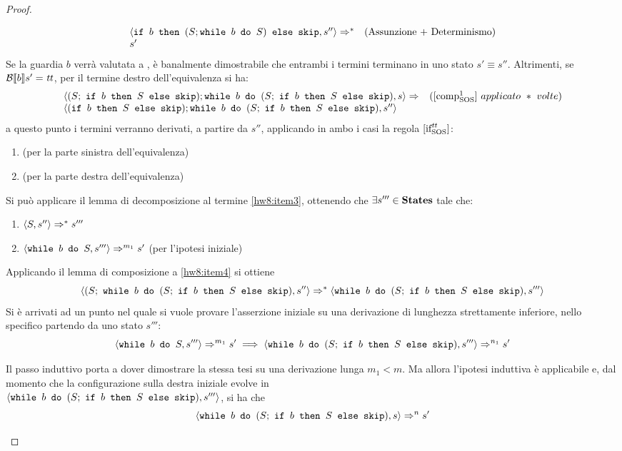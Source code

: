 \begin{proof}
\begin{itemize}
$$\begin{array}{lr}
  \confSs{\ifABC{b}{(S;\wbS{b}{S})}{\skipForFriends}}{s''} \Rar{*} & (\text{Assunzione + Determinismo})\\
  s'
  \end{array}
  $$
  Se la guardia $b$ verrà valutata a \semfalse, è banalmente dimostrabile che
  entrambi i termini terminano in uno stato $s' \equiv{} s''$.
  Altrimenti, se $\B{b}' = \semtrue$, per il termine destro dell'equivalenza 
  si ha:
  $$
  \begin{array}{lr}
  \confSs{ (S;\ \ifABC{b}{S}{\skipForFriends});
            \wbS{b}{(S;\ \ifABC{b}{S}{\skipForFriends})}
         }{s} \Rar{}& (\compoSOS\ applicato\ *\ volte) \\
  \confSs{ (\ifABC{b}{S}{\skipForFriends});
            \wbS{b}{(S;\ \ifABC{b}{S}{\skipForFriends})}
         }{s''}
  \end{array}
  $$
  a questo punto i termini verranno derivati, a partire da $s''$, applicando
  in ambo i casi la regola $\ifttSOS$:
  \begin{enumerate}
    \item {} (per la parte sinistra dell'equivalenza)
    \label{hw8:item3}
    \item {}
      (per la parte destra dell'equivalenza)
  \end{enumerate}
  Si può applicare il lemma di decomposizione al termine \ref{hw8:item3},
  ottenendo che $\exists{s'''} \in \states$ tale che:
  \begin{enumerate}[label=(\alph*)]
    \item $\confSs{S}{s''} \Rar{*} s'''$
    \label{hw8:item4}
    \item $\confSs{\wbS{b}{S}}{s'''} \Rar{m_1} s'$ (per l'ipotesi iniziale)
    \label{hw8:item5}
  \end{enumerate}
  Applicando il lemma di composizione a \ref{hw8:item4} si ottiene
  $$
  \confSs{(S;\ \wbS{b}{(S;\ \ifABC{b}{S}{\skipForFriends})}}{s''}
    \Rar{*}
  \confSs{\wbS{b}{(S;\ \ifABC{b}{S}{\skipForFriends})}}{s'''}
  $$
  Si è arrivati ad un punto nel quale si vuole provare
  l'asserzione iniziale su una derivazione di lunghezza strettamente inferiore,
  nello specifico partendo da uno stato $s'''$:
  $$
    \confSs{\wbS{b}{S}}{s'''} \Rar{m_1} s'
    \implies
    \confSs{\wbS{b}{(S;\ \ifABC{b}{S}{\skipForFriends})}}{s'''} \Rar{n_1} s'
  $$

  Il passo induttivo porta a dover dimostrare la stessa tesi su una
  derivazione lunga $m_1 < m$. Ma allora l'ipotesi induttiva è applicabile e,
  dal momento che la configurazione sulla destra iniziale evolve in \\
  $\confSs{\wbS{b}{(S;\ \ifABC{b}{S}{\skipForFriends})}}{s'''}$, si ha che
  $$
  \confSs{\wbS{b}{(S;\ \ifABC{b}{S}{\skipForFriends})}}{s} \Rar{n} s'
  $$
\end{itemize}


\end{proof}
